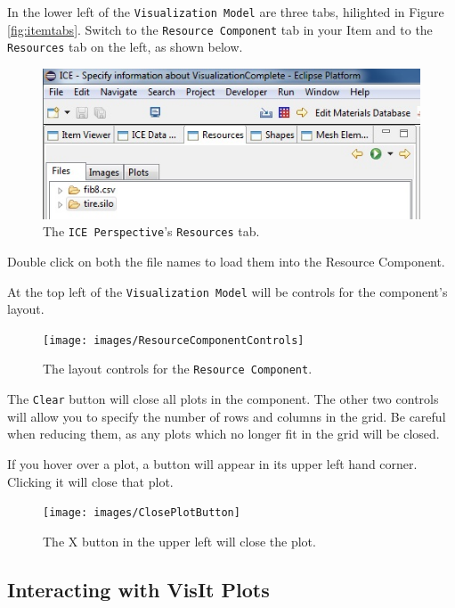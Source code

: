 In the lower left of the \texttt{Visualization Model} are three tabs, hilighted
in Figure \ref{fig:itemtabs}.
Switch to the \texttt{Resource Component} tab in your Item and to the
\texttt{Resources} tab on the left, as shown below.

\begin{figure}[!h]
\includegraphics[width=12cm]{images/ResourcesTab}
\centering
\caption{The \texttt{ICE Perspective}'s \texttt{Resources} tab.}
\label{fig:resourcestab}
\end{figure}

Double click on both the file names to load them into the Resource Component.

At the top left of the \texttt{Visualization Model} will be controls for the
component's layout.

\begin{figure}[!h]
\texttt{[image: images/ResourceComponentControls]}
\centering
\caption{The layout controls for the \texttt{Resource Component}.}
\label{fig:resourcecomponentcontrols}
\end{figure}

The \texttt{Clear} button will close all plots in the component. The other two
controls will allow you to specify the number of rows and columns in the grid.
Be careful when reducing them, as any plots which no longer fit in the grid will
be closed.

If you hover over a plot, a button will appear in its upper left hand corner.
Clicking it will close that plot. 

\begin{figure}[!h]
\texttt{[image: images/ClosePlotButton]}
\centering
\caption{The X button in the upper left will close the plot.}
\label{fig:closeplotbutton}
\end{figure}

\subsection{Interacting with VisIt Plots}

